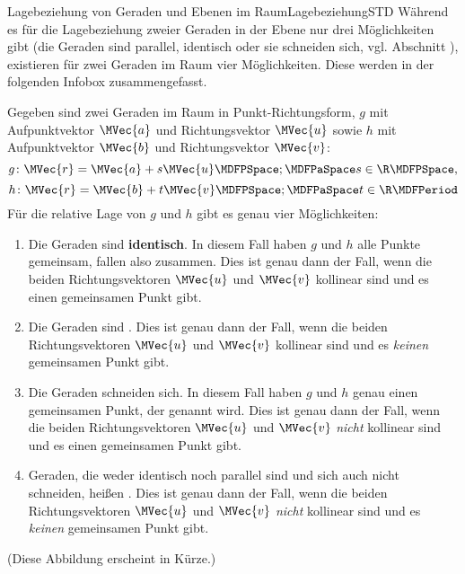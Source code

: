 \begin{MXContent}{Lagebeziehung von Geraden und Ebenen im Raum}{Lagebeziehung}{STD}
Während es für die Lagebeziehung zweier Geraden in der Ebene nur drei Möglichkeiten gibt (die Geraden sind parallel, identisch oder sie schneiden sich, vgl. Abschnitt ), existieren für zwei Geraden im Raum vier Möglichkeiten. Diese werden in der folgenden Infobox zusammengefasst. 

\begin{MInfo}
Gegeben sind zwei Geraden im Raum in Punkt-Richtungsform, $g$ mit Aufpunktvektor $\MVec{a}$ und Richtungsvektor $\MVec{u}$ sowie $h$ mit Aufpunktvektor $\MVec{b}$ und Richtungsvektor $\MVec{v}$:
\[
 g\colon\MVec{r}=\MVec{a}+s\MVec{u}\MDFPSpace;\MDFPaSpace s\in\R \MDFPSpace,
\]
\[
 h\colon\MVec{r}=\MVec{b}+t\MVec{v}\MDFPSpace;\MDFPaSpace t\in\R\MDFPeriod
\]
Für die relative Lage von $g$ und $h$ gibt es genau vier Möglichkeiten:
\begin{enumerate}
 \item Die Geraden sind \textbf{identisch}. In diesem Fall haben $g$ und $h$ alle Punkte gemeinsam, fallen also zusammen. Dies ist genau dann der Fall, wenn die beiden Richtungsvektoren $\MVec{u}$ und $\MVec{v}$ kollinear sind und es einen gemeinsamen Punkt gibt.
 \item Die Geraden sind . Dies ist genau dann der Fall, wenn die beiden Richtungsvektoren $\MVec{u}$ und $\MVec{v}$ kollinear sind und es \textit{keinen} gemeinsamen Punkt gibt.
 \item Die Geraden schneiden sich. In diesem Fall haben $g$ und $h$ genau einen gemeinsamen Punkt, der  genannt wird. Dies ist genau dann der Fall, wenn die beiden Richtungsvektoren $\MVec{u}$ und $\MVec{v}$ \textit{nicht} kollinear sind und es einen gemeinsamen Punkt gibt.
 \item Geraden, die weder identisch noch parallel sind und sich auch nicht schneiden, heißen . Dies ist genau dann der Fall, wenn die beiden Richtungsvektoren $\MVec{u}$ und $\MVec{v}$ \textit{nicht} kollinear sind und es \textit{keinen} gemeinsamen Punkt gibt.
\end{enumerate}

(Diese Abbildung erscheint in Kürze.)

\end{MInfo}


\end{MXContent}

